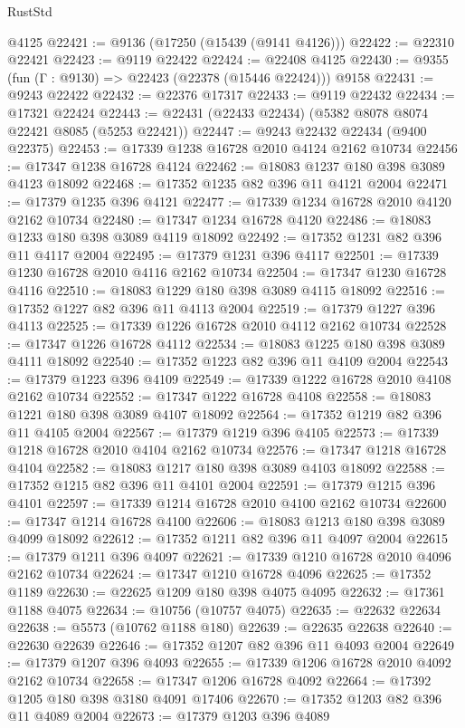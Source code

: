 \begin{lexlean}{RustStd}
\begin{coremodule}
    @4125
@22421 := @9136 (@17250 (@15439 (@9141 @4126)))
@22422 := @22310 @22421
@22423 := @9119 @22422
@22424 := @22408 @4125
@22430 := @9355 (fun (Γ : @9130) => @22423 (@22378 (@15446 @22424))) @9158
@22431 := @9243 @22422
@22432 := @22376 @17317
@22433 := @9119 @22432
@22434 := @17321 @22424
@22443 := @22431 (@22433 @22434) (@5382 @8078 @8074 @22421 @8085 (@5253 @22421))
@22447 := @9243 @22432 @22434 (@9400 @22375)
@22453 := @17339 @1238 @16728 @2010 @4124 @2162 @10734
@22456 := @17347 @1238 @16728 @4124
@22462 := @18083 @1237 @180 @398 @3089 @4123 @18092
@22468 := @17352 @1235 @82 @396 @11 @4121 @2004
@22471 := @17379 @1235 @396 @4121
@22477 := @17339 @1234 @16728 @2010 @4120 @2162 @10734
@22480 := @17347 @1234 @16728 @4120
@22486 := @18083 @1233 @180 @398 @3089 @4119 @18092
@22492 := @17352 @1231 @82 @396 @11 @4117 @2004
@22495 := @17379 @1231 @396 @4117
@22501 := @17339 @1230 @16728 @2010 @4116 @2162 @10734
@22504 := @17347 @1230 @16728 @4116
@22510 := @18083 @1229 @180 @398 @3089 @4115 @18092
@22516 := @17352 @1227 @82 @396 @11 @4113 @2004
@22519 := @17379 @1227 @396 @4113
@22525 := @17339 @1226 @16728 @2010 @4112 @2162 @10734
@22528 := @17347 @1226 @16728 @4112
@22534 := @18083 @1225 @180 @398 @3089 @4111 @18092
@22540 := @17352 @1223 @82 @396 @11 @4109 @2004
@22543 := @17379 @1223 @396 @4109
@22549 := @17339 @1222 @16728 @2010 @4108 @2162 @10734
@22552 := @17347 @1222 @16728 @4108
@22558 := @18083 @1221 @180 @398 @3089 @4107 @18092
@22564 := @17352 @1219 @82 @396 @11 @4105 @2004
@22567 := @17379 @1219 @396 @4105
@22573 := @17339 @1218 @16728 @2010 @4104 @2162 @10734
@22576 := @17347 @1218 @16728 @4104
@22582 := @18083 @1217 @180 @398 @3089 @4103 @18092
@22588 := @17352 @1215 @82 @396 @11 @4101 @2004
@22591 := @17379 @1215 @396 @4101
@22597 := @17339 @1214 @16728 @2010 @4100 @2162 @10734
@22600 := @17347 @1214 @16728 @4100
@22606 := @18083 @1213 @180 @398 @3089 @4099 @18092
@22612 := @17352 @1211 @82 @396 @11 @4097 @2004
@22615 := @17379 @1211 @396 @4097
@22621 := @17339 @1210 @16728 @2010 @4096 @2162 @10734
@22624 := @17347 @1210 @16728 @4096
@22625 := @17352 @1189
@22630 := @22625 @1209 @180 @398 @4075 @4095
@22632 := @17361 @1188 @4075
@22634 := @10756 (@10757 @4075)
@22635 := @22632 @22634
@22638 := @5573 (@10762 @1188 @180)
@22639 := @22635 @22638
@22640 := @22630 @22639
@22646 := @17352 @1207 @82 @396 @11 @4093 @2004
@22649 := @17379 @1207 @396 @4093
@22655 := @17339 @1206 @16728 @2010 @4092 @2162 @10734
@22658 := @17347 @1206 @16728 @4092
@22664 := @17392 @1205 @180 @398 @3180 @4091 @17406
@22670 := @17352 @1203 @82 @396 @11 @4089 @2004
@22673 := @17379 @1203 @396 @4089

\end{coremodule}
\end{lexlean}
